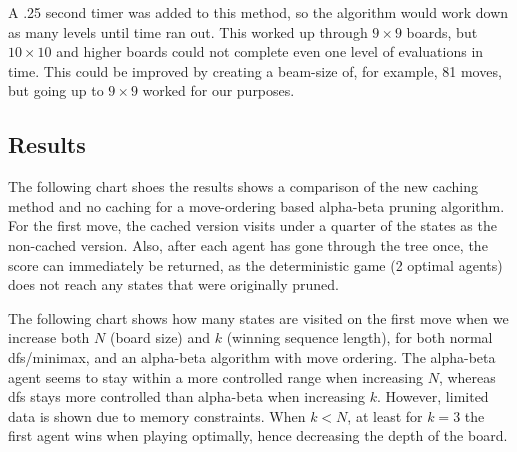 A .25 second timer was added to this method, so the algorithm would work down as many levels until time ran out. This worked up through \(9\times9\) boards, but \(10\times10\) and higher boards could not complete even one level of evaluations in time. This could be improved by creating a beam-size of, for example, 81 moves, but going up to \(9\times9\) worked for our purposes.


\subsection{Results}
The following chart shoes the results shows a comparison of the new caching method and no caching for a move-ordering based alpha-beta pruning algorithm. For the first move, the cached version visits under a quarter of the states as the non-cached version. Also, after each agent has gone through the tree once, the score can immediately be returned, as the deterministic game (2 optimal agents) does not reach any states that were originally pruned.

\begin{center}
\end{center}

The following chart shows how many states are visited on the first move when we increase both \(N\) (board size) and \(k\) (winning sequence length), for both normal dfs/minimax, and an alpha-beta algorithm with move ordering. The alpha-beta agent seems to stay within a more controlled range when increasing \(N\), whereas dfs stays more controlled than alpha-beta when increasing \(k\). However, limited data is shown due to memory constraints. When \(k<N\), at least for \(k=3\) the first agent wins when playing optimally, hence decreasing the depth of the board.

